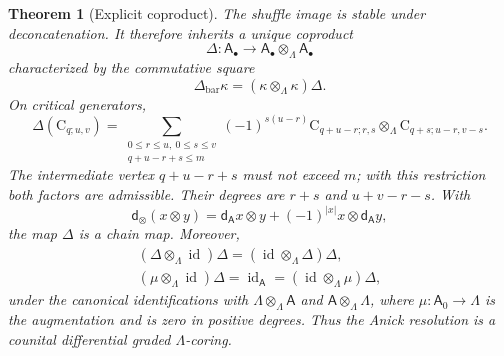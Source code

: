 \documentclass[a4paper,11pt,oneside,reqno]{amsart}
\newtheorem{theorem}{Theorem}[section]
\theoremstyle{definition}
\numberwithin{equation}{section}
\begin{document}
\begin{theorem}[Explicit coproduct]\label{cup:thm:diagonal}
The shuffle image is stable under deconcatenation. It therefore
inherits a unique coproduct
\[
 \Delta:\mathsf A_\bullet\longrightarrow
 \mathsf A_\bullet\otimes_\Lambda\mathsf A_\bullet
\]
characterized by the commutative square
\begin{equation}\label{cup:eq:diagonal-comparison}
 \boxed{\Delta_{\mathrm{bar}}\kappa
 =(\kappa\otimes_\Lambda\kappa)\Delta.}
\end{equation}
On critical generators,
\begin{equation}\label{cup:eq:diagonal}
 \boxed{\displaystyle
 \Delta(\mathrm C_{q;u,v})
 =\sum_{\substack{0\leq r\leq u,\ 0\leq s\leq v\\q+u-r+s\leq m}}
 (-1)^{s(u-r)}
 \mathrm C_{q+u-r;r,s}\otimes_\Lambda
 \mathrm C_{q+s;u-r,v-s}.}
\end{equation}
The intermediate vertex $q+u-r+s$ must not exceed $m$; with this
restriction both factors are admissible. Their degrees are
$r+s$ and $u+v-r-s$. With
\[
 \mathsf d_\otimes(x\otimes y)
 =\mathsf d_{\mathsf A}x\otimes y
 +(-1)^{|x|}x\otimes\mathsf d_{\mathsf A}y,
\]
the map $\Delta$ is a chain map. Moreover,
\begin{equation}\label{cup:eq:coassociativity}
\begin{gathered}
 (\Delta\otimes_\Lambda\operatorname{id})\Delta
 =(\operatorname{id}\otimes_\Lambda\Delta)\Delta,\\
 (\mu\otimes_\Lambda\operatorname{id})\Delta
 =\operatorname{id}_{\mathsf A}
 =(\operatorname{id}\otimes_\Lambda\mu)\Delta,
\end{gathered}
\end{equation}
under the canonical identifications with $\Lambda\otimes_\Lambda
\mathsf A$ and $\mathsf A\otimes_\Lambda\Lambda$, where
$\mu:\mathsf A_0\to\Lambda$ is the augmentation and is zero
in positive degrees. Thus the Anick resolution is a counital
differential graded $\Lambda$-coring.
\end{theorem}
\end{document}
